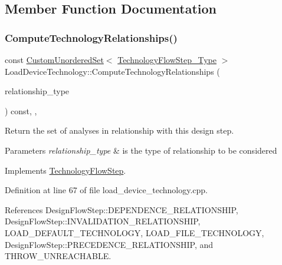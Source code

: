 \subsection{Member Function Documentation}
\mbox{\label{classLoadDeviceTechnology_a5db6b3f94fc4252f2104c37c0ac21ce7}} 
\subsubsection{\texorpdfstring{Compute\+Technology\+Relationships()}{ComputeTechnologyRelationships()}}
{\footnotesize\ttfamily const \hyperlink{classCustomUnorderedSet}{Custom\+Unordered\+Set}$<$ \hyperlink{technology__flow__step_8hpp_a65208cfec963a7d7def292f9db428292}{Technology\+Flow\+Step\+\_\+\+Type} $>$ Load\+Device\+Technology\+::\+Compute\+Technology\+Relationships (\begin{DoxyParamCaption}\item[{const \hyperlink{classDesignFlowStep_a723a3baf19ff2ceb77bc13e099d0b1b7}{Design\+Flow\+Step\+::\+Relationship\+Type}}]{relationship\+\_\+type }\end{DoxyParamCaption}) const\hspace{0.3cm}{\ttfamily [override]}, {\ttfamily [protected]}, {\ttfamily [virtual]}}



Return the set of analyses in relationship with this design step. 


\begin{DoxyParams}{Parameters}
{\em relationship\+\_\+type} & is the type of relationship to be considered \\
\hline
\end{DoxyParams}


Implements \hyperlink{classTechnologyFlowStep_ab543169c9b0143c8ae8831d765519075}{Technology\+Flow\+Step}.



Definition at line 67 of file load\+\_\+device\+\_\+technology.\+cpp.



References Design\+Flow\+Step\+::\+D\+E\+P\+E\+N\+D\+E\+N\+C\+E\+\_\+\+R\+E\+L\+A\+T\+I\+O\+N\+S\+H\+IP, Design\+Flow\+Step\+::\+I\+N\+V\+A\+L\+I\+D\+A\+T\+I\+O\+N\+\_\+\+R\+E\+L\+A\+T\+I\+O\+N\+S\+H\+IP, L\+O\+A\+D\+\_\+\+D\+E\+F\+A\+U\+L\+T\+\_\+\+T\+E\+C\+H\+N\+O\+L\+O\+GY, L\+O\+A\+D\+\_\+\+F\+I\+L\+E\+\_\+\+T\+E\+C\+H\+N\+O\+L\+O\+GY, Design\+Flow\+Step\+::\+P\+R\+E\+C\+E\+D\+E\+N\+C\+E\+\_\+\+R\+E\+L\+A\+T\+I\+O\+N\+S\+H\+IP, and T\+H\+R\+O\+W\+\_\+\+U\+N\+R\+E\+A\+C\+H\+A\+B\+LE.

